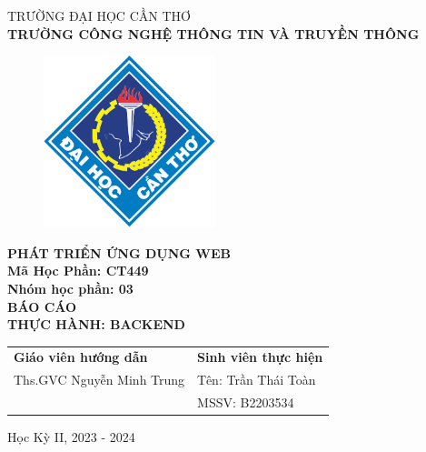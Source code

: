\begin{titlepage}
  \begin{center}
    \vspace{-6pt}TRƯỜNG ĐẠI HỌC CẦN THƠ \\
    \textbf{\fontsize{16pt}{0pt}\selectfont TRƯỜNG CÔNG NGHỆ THÔNG TIN VÀ TRUYỀN THÔNG}
    \begin{figure}[H]
      \centering
      \includegraphics[width=5cm]{images/logo-ctu.png}
    \end{figure}
    \textbf{PHÁT TRIỂN ỨNG DỤNG WEB} \\
    \textbf{Mã Học Phần: CT449} \\
    \textbf{Nhóm học phần: 03} \\
    \vspace{3.5cm}
    \textbf{\fontsize{16pt}{0pt}\selectfont BÁO CÁO} \\
    \textbf{\fontsize{18pt}{0pt}\selectfont THỰC HÀNH: BACKEND} \\
    \vspace{4.5cm}
    \newcommand{\MyIndent}{\hspace{1cm}}
    \begin{tabular}{p{8cm} l}
      \textbf{Giáo viên hướng dẫn}        & \textbf{Sinh viên thực hiện}  \\
      \MyIndent Ths.GVC Nguyễn Minh Trung & \MyIndent Tên: Trần Thái Toàn \\
                                          & \MyIndent MSSV: B2203534
    \end{tabular}


    \vspace{2cm}
    \fontsize{14pt}{0pt}\selectfont Học Kỳ II, 2023 - 2024
  \end{center}
\end{titlepage}
\cleardoublepage